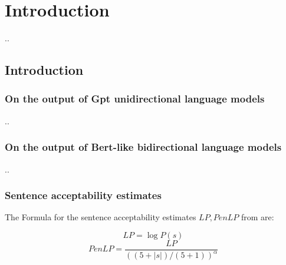\chapter{Introduction}

..

\section{Introduction}

\subsection{On the output of Gpt unidirectional language models}

..

\subsection{On the output of Bert-like bidirectional language models}
..

\subsection{Sentence acceptability estimates}

The Formula for the sentence acceptability estimates \( LP, PenLP \) from \citet{lau2020furiously} are:

\begin{displaymath}
	LP = \log P(s)
\end{displaymath}
\begin{displaymath}
	PenLP = \frac{LP}{((5+|s|) \big/ (5+1))^\alpha}
\end{displaymath}

